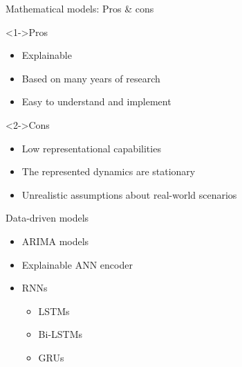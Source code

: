 
\begin{frame}{Mathematical models: Pros \& cons}
    \begin{exampleblock}<1->{Pros}
    \begin{itemize}
        \item Explainable
        \item Based on many years of research
        \item Easy to understand and implement
    \end{itemize}
    \end{exampleblock}

    \begin{alertblock}<2->{Cons}
    \begin{itemize}
        \item Low representational capabilities
        \item The represented dynamics are stationary
        \item Unrealistic assumptions about real-world scenarios
    \end{itemize}
    \end{alertblock}
\end{frame}

\begin{frame}{Data-driven models}
    \begin{itemize}
        \item<1-> \gls{ARIMA} models \cite{ceylanEstimationCOVID19Prevalence2020,singhPredictionCOVID19Pandemic2020,ribeiroShorttermForecastingCOVID192020}
        \item<2-> Explainable \gls{ANN} encoder \cite{ramchandaniDeepCOVIDNetInterpretableDeep2020}
        \item<3-> \glspl{RNN} \cite{chimmulaTimeSeriesForecasting2020,shahidPredictionsCOVID19Deep2020}
        \begin{itemize}
            \item \glspl{LSTM}
            \item \glspl{Bi-LSTM}
            \item \glspl{GRU}
        \end{itemize}
    \end{itemize}
\end{frame}

